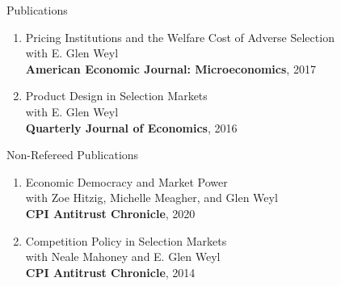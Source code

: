 \documentclass{resume}
\begin{document}
\begin{rSection}{Publications}
\begin{enumerate}
\item Pricing Institutions and the Welfare Cost of Adverse Selection\\
 with E. Glen Weyl \\
\textbf{American Economic Journal: Microeconomics}, 2017

\item Product Design in Selection Markets\\
 with E. Glen Weyl \\ 
\textbf{Quarterly Journal of Economics}, 2016
	
\end{enumerate}






\end{rSection}






\begin{rSection}{Non-Refereed Publications}
	
\begin{enumerate}

\item Economic Democracy and Market Power\\
with Zoe Hitzig, Michelle Meagher, and Glen Weyl \\ 
\textbf{CPI Antitrust Chronicle}, 2020


\item Competition Policy in Selection Markets\\ 
with Neale Mahoney and E. Glen Weyl \\ 
\textbf{CPI Antitrust Chronicle}, 2014
	
		
\end{enumerate}


\end{rSection}
\end{document}

